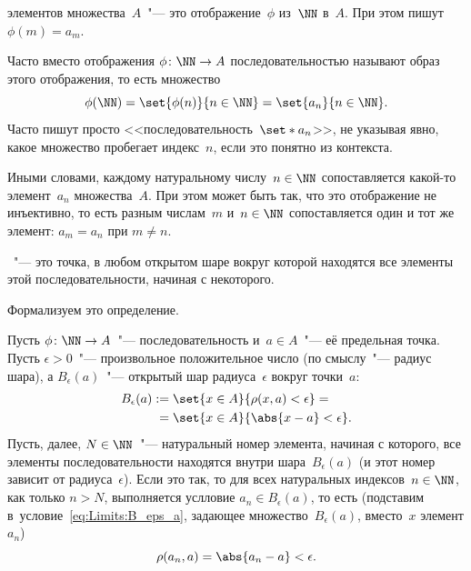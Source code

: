 \begin{definition}
	 элементов множества~$A$~"--- это отображение~$\phi$
	из~$\NN$ в~$A$. При этом пишут $\phi(m) = a_m$.

	Часто вместо отображения $\phi \colon \NN \to A$ последовательностью называют
	образ этого отображения, то есть множество
	\[
		\phi(\NN) = \set{\phi(n)}{n \in \NN} = \set{a_n}{n \in \NN}
		.
	\]
	Часто пишут просто <<последовательность~$\set*{a_n}$>>, не указывая явно,
	какое множество пробегает индекс~$n$, если это понятно из контекста.
\end{definition}
Иными словами, каждому натуральному числу~$n \in \NN$ сопоставляется какой-то
элемент~$a_n$ множества~$A$. При этом может быть так, что это отображение не
инъективно, то есть разным числам~$m$ и~$n \in \NN$ сопоставляется один и тот
же элемент: $a_m = a_n$ при $m \neq n$.


\begin{definition}
	~"--- это точка, в любом открытом
	шаре вокруг которой находятся все элементы этой последовательности, начиная с
	некоторого.
\end{definition}

Формализуем это определение.

Пусть $\phi\colon \NN \to A$~"--- последовательность и~$a \in A$~"--- её предельная точка. Пусть $\epsilon > 0$~"--- произвольное положительное число (по смыслу~"--- радиус шара), а $B_\epsilon(a)$~"--- открытый шар радиуса~$\epsilon$ вокруг точки~$a$:
\begin{align}
	B_\epsilon(a) :=
	{} &
	\set{x \in A}{\rho(x, a) < \epsilon}
	\label{eq:Limits:B_eps_a}
	= {} \\ {} = {} &
	\set{x \in A}{\abs{x - a} < \epsilon}
	.
	\notag
\end{align}
Пусть, далее, $N \in \NN$~"--- натуральный номер элемента, начиная с которого, все элементы последовательности находятся внутри шара~$B_\epsilon(a)$ (и этот номер зависит от радиуса~$\epsilon$). Если это так, то для всех натуральных индексов~$n \in \NN$, как только $n > N$, выполняется услловие $a_n \in B_\epsilon(a)$, то есть (подставим в~условие~\eqref{eq:Limits:B_eps_a}, задающее множество~$B_\epsilon(a)$, вместо~$x$ элемент $a_n$)
\[
	\rho(a_n, a) = \abs{a_n - a} < \epsilon.
\]

